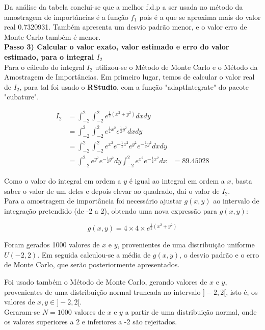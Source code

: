 \documentclass[letterpaper,11pt]{article}
\begin{document}
Da análise da tabela conclui-se que a melhor f.d.p a ser usada no método da amostragem de importâncias é a função $f_1$ pois é a que se aproxima mais do valor real 0.7320931. Também apresenta um desvio padrão menor, e o valor erro de Monte Carlo também é menor.\\

\textbf{Passo 3) Calcular o valor exato, valor estimado e erro do valor estimado, para o integral $I_2$} \\

Para o cálculo do integral $I_2$ utilizou-se o Método de Monte Carlo e o Método da Amostragem de Importâncias. Em primeiro lugar, temos de calcular o valor real de $I_2$, para tal foi usado o \textbf{RStudio}, com a função "adaptIntegrate" do pacote "cubature".

\begin{align*}
I_2 & = \int_{-2}^{2} \int_{-2}^{2}e^{\frac{1}{2}(x^2+y^2)} dxdy\\
& = \int_{-2}^{2} \int_{-2}^{2} e^{\frac{1}{2}x^2} e^{\frac{1}{2}y^2}dxdy\\
& = \int_{-2}^{2} \int_{-2}^{2} e^{x^2}e^{-\frac{1}{2}x^2} e^{y^2} e^{-\frac{1}{2}y^2}dxdy\\
& = \int_{-2}^{2} e^{y^2} e^{-\frac{1}{2}y^2}dy \int_{-2}^{2}e^{x^2}e^{-\frac{1}{2}x^2} dx
& = 89.45028
\end{align*}

Como o valor do integral em ordem a $y$ é igual ao integral em ordem a $x$, basta saber o valor de um deles e depois elevar ao quadrado, daí o valor de $I_2$.\\
Para a amostragem de importância foi necessário ajustar $g(x, y)$ ao
intervalo de integração pretendido (de -2 a 2), obtendo uma nova expressão para $g(x,y)$: 

\begin{equation} 
g(x,y) = 4 \times 4 \times e^{\frac{1}{2}(x^2+y^2)}
\end{equation}

Foram gerados 1000 valores de $x$ e $y$, provenientes de uma distribuição uniforme $U(-2,2)$. Em seguida calculou-se a média de $g(x,y )$, o desvio padrão e o erro de Monte Carlo, que serão posteriormente apresentados.

Foi usado também o Método de Monte Carlo, gerando valores de $x$ e $y$, provenientes de uma distribuição normal truncada no intervalo $]-2,2[$, isto é, os valores de $x,y \in ]-2,2[$.\\
Geraram-se $N=1000$ valores de $x$ e $y$ a partir de uma distribuição normal, onde os valores superiores a 2 e inferiores a -2 são rejeitados.
\end{document}
